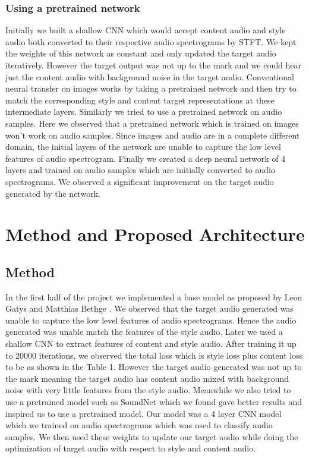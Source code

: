 \documentclass[10pt,twocolumn,letterpaper]{article}
\begin{document}
\subsubsection{Using a pretrained network}
Initially we built a shallow CNN which would accept content audio and style audio both converted to their respective audio spectrograms by STFT. We kept the weights of this network as constant and only updated the target audio iteratively. However the target output was not up to the mark and we could hear just the content audio with background noise in the target audio. Conventional neural transfer on images works by taking a pretrained network and then try to match the corresponding style and content target representations at these intermediate layers. Similarly we tried to use a pretrained network on audio samples. Here we observed that a pretrained network which is trained on images won't work on audio samples. Since images and audio are in a complete different domain, the initial layers of the network are unable to capture the low level features of audio spectrogram. Finally we created a deep neural network of 4 layers and trained on audio samples which are initially converted to audio spectrograms. We observed a significant improvement on the target audio generated by the network.



\section{Method and Proposed Architecture}
\subsection{Method}
In the first half of the project we implemented a base model as proposed by Leon Gatys and Matthias Bethge \cite{Authors00001}. We observed that the target audio generated was unable to capture the low level features of audio spectrograms. Hence the audio generated was unable match the features of the style audio. 
Later we used a shallow CNN to extract features of content and style audio. After training it up to 20000 iterations, we observed the total loss which is style loss plus content loss to be as shown in the Table 1. However the target audio generated was not up to the mark meaning the target audio has content audio mixed with background noise with very little features from the style audio. Meanwhile we also tried to use a pretrained model such as SoundNet which we found gave better results and inspired us to use a pretrained model. Our model was a 4 layer CNN model which we trained on audio spectrograms which was used to classify audio samples. We then used these weights to update our target audio while doing the optimization of target audio with respect to style and content audio.
\end{document}
